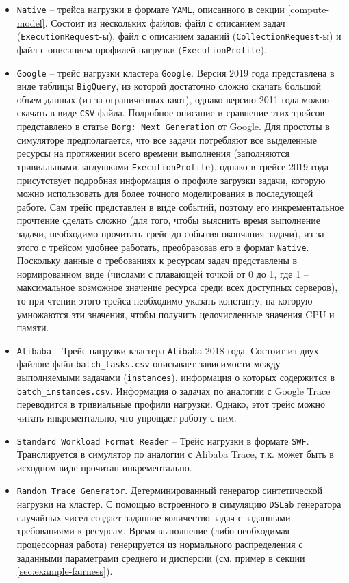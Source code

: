 \begin{itemize}
   \item \texttt{Native} -- трейса нагрузки в формате \texttt{YAML}, описанного в секции \ref{compute-model}. Состоит из нескольких файлов: файл с описанием задач (\texttt{ExecutionRequest}-ы), файл с описанием заданий (\texttt{CollectionRequest}-ы) и файл с описанием профилей нагрузки (\texttt{ExecutionProfile}).
   \item \texttt{Google} -- трейс нагрузки кластера \texttt{Google}\cite{google-clusterdata}. Версия 2019 года представлена в виде таблицы \texttt{BigQuery}, из которой достаточно сложно скачать большой объем данных (из-за ограниченных квот), однако версию 2011 года можно скачать в виде \texttt{CSV}-файла. Подробное описание и сравнение этих трейсов представлено в статье \texttt{Borg: Next Generation}\cite{borg-next-gen} от Google. Для простоты в симуляторе предполагается, что все задачи потребляют все выделенные ресурсы на протяжении всего времени выполнения (заполняются тривиальными заглушками \texttt{ExecutionProfile}), однако в трейсе 2019 года присутствует подробная информация о профиле загрузки задачи, которую можно использовать для более точного моделирования в последующей работе. Сам трейс представлен в виде событий, поэтому его инкрементальное прочтение сделать сложно (для того, чтобы выяснить время выполнение задачи, необходимо прочитать трейс до события окончания задачи), из-за этого с трейсом удобнее работать, преобразовав его в формат \texttt{Native}. Поскольку данные о требованиях к ресурсам задач представлены в нормированном виде (числами с плавающей точкой от 0 до 1, где 1 -- максимальное возможное значение ресурса среди всех доступных серверов), то при чтении этого трейса необходимо указать константу, на которую умножаются эти значения, чтобы получить целочисленные значения CPU и памяти. 
   \item \texttt{Alibaba} -- Трейс нагрузки кластера \texttt{Alibaba} 2018 года\cite{alibaba-clusterdata}. Состоит из двух файлов: файл \texttt{batch\_tasks.csv} описывает зависимости между выполняемыми задачами (\texttt{instances}), информация о которых содержится в \texttt{batch\_instances.csv}. Информация о задачах по аналогии с Google Trace переводится в тривиальные профили нагрузки. Однако, этот трейс можно читать инкрементально, что упрощает работу с ним.  
   \item \texttt{Standard Workload Format Reader} -- Трейс нагрузки в формате \texttt{SWF}\cite{standard-workload-format}. Транслируется в симулятор по аналогии с Alibaba Trace, т.к. может быть в исходном виде прочитан инкрементально. 
   \item \texttt{Random Trace Generator}. Детерминированный генератор синтетической нагрузки на кластер. С помощью встроенного в симуляцию \texttt{DSLab} генератора случайных чисел создает заданное количество задач с заданными требованиями к ресурсам. Время выполнение (либо необходимая процессорная работа) генерируется из нормального распределения с заданными параметрами среднего и дисперсии (см. пример в секции \ref{sec:example-fairness}).

\end{itemize}

